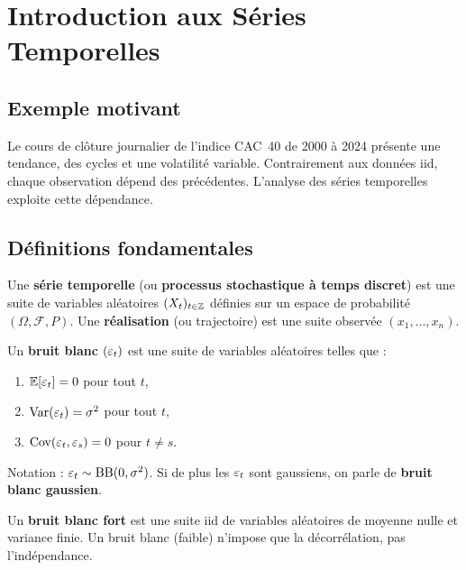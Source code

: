 \chapter{Introduction aux S\'eries Temporelles}
\label{ch:intro}

\section{Exemple motivant}
Le cours de cl\^oture journalier de l'indice CAC~40 de 2000 \`a 2024 pr\'esente une tendance, des cycles et une volatilit\'e variable. Contrairement aux donn\'ees iid, chaque observation d\'epend des pr\'ec\'edentes. L'analyse des s\'eries temporelles exploite cette d\'ependance.

\section{D\'efinitions fondamentales}

\begin{definition}
Une \textbf{s\'erie temporelle} (ou \textbf{processus stochastique \`a temps discret}) est une suite de variables al\'eatoires $(X_t)_{t\in\mathbb{Z}}$ d\'efinies sur un espace de probabilit\'e $(\Omega,\mathcal{F},P)$. Une \textbf{r\'ealisation} (ou trajectoire) est une suite observ\'ee $(x_1,\ldots,x_n)$.
\end{definition}

\begin{definition}
Un \textbf{bruit blanc} $(\varepsilon_t)$ est une suite de variables al\'eatoires telles que :
\begin{enumerate}
\item $\mathbb{E}[\varepsilon_t]=0$ pour tout $t$,
\item $\operatorname{Var}(\varepsilon_t)=\sigma^2$ pour tout $t$,
\item $\operatorname{Cov}(\varepsilon_t,\varepsilon_s)=0$ pour $t\neq s$.
\end{enumerate}
Notation : $\varepsilon_t\sim\mathrm{BB}(0,\sigma^2)$. Si de plus les $\varepsilon_t$ sont gaussiens, on parle de \textbf{bruit blanc gaussien}.
\end{definition}

\begin{definition}
Un \textbf{bruit blanc fort} est une suite iid de variables al\'eatoires de moyenne nulle et variance finie. Un bruit blanc (faible) n'impose que la d\'ecorr\'elation, pas l'ind\'ependance.
\end{definition}

